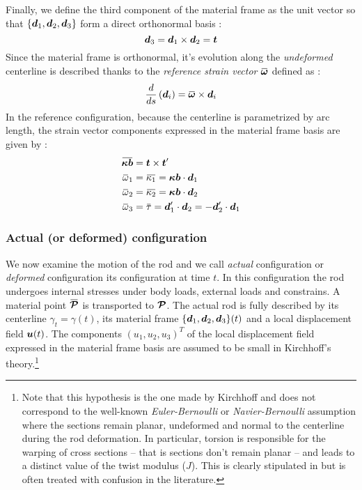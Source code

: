 Finally, we define the third component of the material frame as the unit vector so that $\{{\boldsymbol{d}_1}, {\boldsymbol{d}_2}, {\boldsymbol{d}_3}\}$ form a direct orthonormal basis : 
\begin{equation}
	{\boldsymbol{d}_3} = {\boldsymbol{d}_1} \times {\boldsymbol{d}_2} = {\boldsymbol{t}}
\end{equation}
Since the material frame is orthonormal, it's evolution along the \emph{undeformed} centerline is described thanks to the \emph{reference strain vector} $\overbar{\vect{\omega}}$ defined as :
\begin{equation}
	\frac{d}{d s}\left(\vect{d}_i\right) = \overbar{\vect{\omega}}  \times \vect{d}_i
\end{equation}
In the reference configuration, because the centerline is parametrized by arc length, the strain vector components expressed in the material frame basis are given by :
\begin{subequations}
	\begin{align}
		\overbar{\vect{\kappa b}} &=  \vect{t} \times  \vect{t}' 
		\\
		\overbar{\omega}_1 &= \overbar{\kappa_1} = \vect{\kappa b} \cdot \vect{d}_1
		\\
		\overbar{\omega}_2 &= \overbar{\kappa_2} = \vect{\kappa b} \cdot \vect{d}_2
		\\
		\overbar{\omega}_3 &= \overbar{\tau} = \vect{d}'_1  \cdot \vect{d}_2 = - \vect{d}'_2  \cdot \vect{d}_1
	\end{align}
\end{subequations}


\subsubsection{Actual (or deformed) configuration}

We now examine the motion of the rod and we call \emph{actual} configuration or \emph{deformed} configuration its configuration at time $t$. In this configuration the rod undergoes internal stresses under body loads, external loads and constrains. A material point $\overbar{\vect{\mathcal{P}}}$ is transported to ${\boldsymbol{\mathcal{P}}}$. The actual rod is fully described by its centerline $\gamma_t = \gamma(t)$, its material frame $\{{\boldsymbol{d}_1}, {\boldsymbol{d}_2}, {\boldsymbol{d}_3}\}(t)$ and a local displacement field $\boldsymbol{u}(t)$. The components $(u_1, u_2, u_3)^T$ of the local displacement field expressed in the material frame basis are assumed to be small in Kirchhoff's theory.\footnote{Note that this hypothesis is the one made by Kirchhoff and does not correspond to the well-known \emph{Euler-Bernoulli} or \emph{Navier-Bernoulli} assumption where the sections remain planar, undeformed and normal to the centerline during the rod deformation. In particular, torsion is responsible for the warping of cross sections -- that is sections don't remain planar -- and leads to a distinct value of the twist modulus ($J$). This is clearly stipulated in \cite{Dill1992, Audoly2010} but is often treated with confusion in the literature.}


